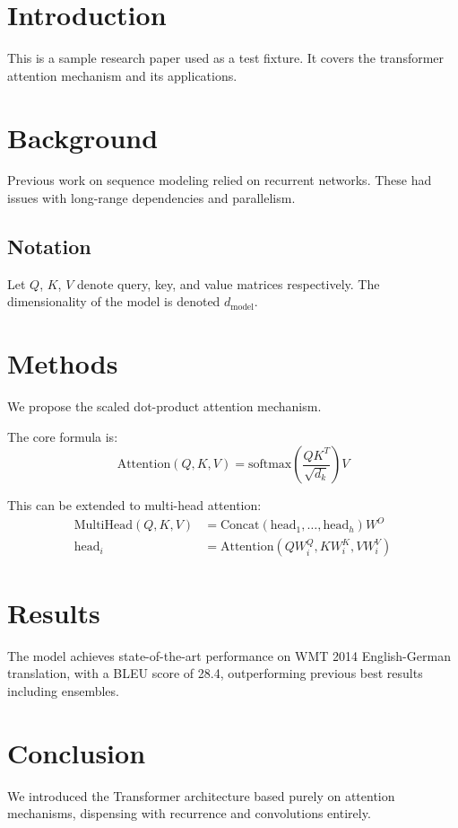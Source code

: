 \documentclass{article}
\begin{document}
\section{Introduction}
This is a sample research paper used as a test fixture.
It covers the transformer attention mechanism and its applications.

\section{Background}
Previous work on sequence modeling relied on recurrent networks.
These had issues with long-range dependencies and parallelism.

\subsection{Notation}
Let $Q$, $K$, $V$ denote query, key, and value matrices respectively.
The dimensionality of the model is denoted $d_{\text{model}}$.

\section{Methods}
We propose the scaled dot-product attention mechanism.

The core formula is:
\begin{equation}
\text{Attention}(Q, K, V) = \text{softmax}\left(\frac{QK^T}{\sqrt{d_k}}\right)V
\end{equation}

This can be extended to multi-head attention:
\begin{align}
\text{MultiHead}(Q, K, V) &= \text{Concat}(\text{head}_1, \ldots, \text{head}_h) W^O \\
\text{head}_i &= \text{Attention}(QW_i^Q, KW_i^K, VW_i^V)
\end{align}

\section{Results}
The model achieves state-of-the-art performance on WMT 2014 English-German translation,
with a BLEU score of 28.4, outperforming previous best results including ensembles.

\section{Conclusion}
We introduced the Transformer architecture based purely on attention mechanisms,
dispensing with recurrence and convolutions entirely.
\end{document}
